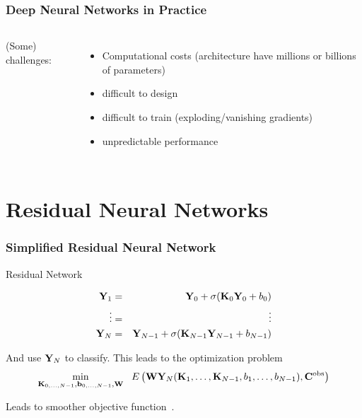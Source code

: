 \documentclass[12pt,fleqn,handout]{beamer}
\begin{document}
\begin{frame}[fragile]\frametitle{Deep Neural Networks in Practice}

\begin{columns}
(Some) challenges:
\begin{itemize}
\item
Computational costs (architecture have millions or billions of parameters)
\item
difficult to design
\item
difficult to train (exploding/vanishing gradients)
\item
unpredictable performance
\end{itemize}

\bigskip
{}
	
\end{columns}


\end{frame}





\section{Residual Neural Networks} %
\label{sec:residual_neural_networks}

\begin{frame}[fragile]\frametitle{Simplified Residual Neural Network}

Residual Network

\bigskip

\begin{eqnarray*}
{\bf Y}_1 &=& {\bf Y}_0 + \sigma({\bf K}_0{\bf Y}_0 + b_0) \\
\vdots &=&  \vdots \\
 {\bf Y}_N &=& {\bf Y}_{N-1} + \sigma( {\bf K}_{N-1}{\bf Y}_{N-1} + b_{N-1})
 \end{eqnarray*}

And use ${\bf Y}_N$ to classify. This leads to the optimization problem
$$ 
\min_{{\bf K}_{0,\ldots,N-1},{\bf b}_{0,\ldots,N-1},{\bf W}} \ \ E\left({\bf W}{\bf Y}_N({\bf K}_1,\ldots,{\bf K}_{N-1},b_1,\ldots, b_{N-1}), {\bf C}^{\rm obs} \right)
 $$

\bigskip
\begin{center}
	Leads to smoother objective function~\cite{LiEtAl2017}. 
	\end{center}

\end{frame}
\end{document}
